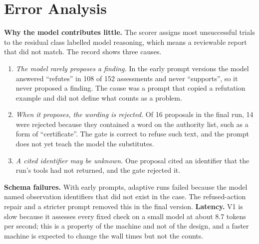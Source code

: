 \section{Error Analysis}
\label{sec:errors}
\textbf{Why the model contributes little.} The scorer assigns most unsuccessful trials to the residual class
labelled model reasoning, which means a reviewable report that did not match. The record shows three causes.
\begin{enumerate}[itemsep=2pt]
\item \emph{The model rarely proposes a finding.} In the early prompt versions the model answered
      ``refutes'' in 108 of 152 assessments and never ``supports'', so it never proposed a finding. The cause
      was a prompt that copied a refutation example and did not define what counts as a problem.
\item \emph{When it proposes, the wording is rejected.} Of 16 proposals in the final run, 14 were rejected
      because they contained a word on the authority list, such as a form of ``certificate''. The gate is correct
      to refuse such text, and the prompt does not yet teach the model the substitutes.
\item \emph{A cited identifier may be unknown.} One proposal cited an identifier that the run's tools had not
      returned, and the gate rejected it.
\end{enumerate}
\textbf{Schema failures.} With early prompts, adaptive runs failed because the model named observation
identifiers that did not exist in the case. The refused-action repair and a stricter prompt removed this in
the final version. \textbf{Latency.} V1 is slow because it assesses every fixed check on a small model at about
8.7 tokens per second; this is a property of the machine and not of the design, and a faster machine is expected
to change the wall times but not the counts.

